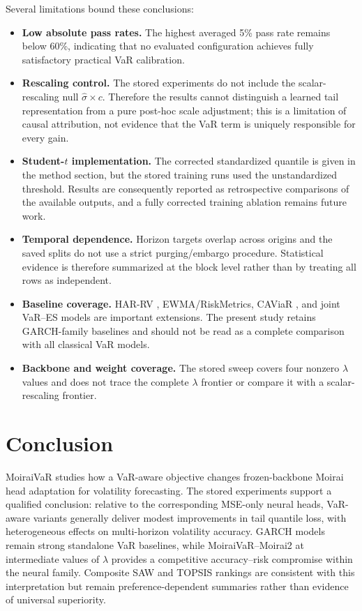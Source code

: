 \documentclass[runningheads]{llncs}
\begin{document}
Several limitations bound these conclusions:
\begin{itemize}
\item \textbf{Low absolute pass rates.} The highest averaged 5\% pass rate remains below 60\%, indicating that no evaluated configuration achieves fully satisfactory practical VaR calibration.
\item \textbf{Rescaling control.} The stored experiments do not include the scalar-rescaling null $\hat{\sigma}\times c$. Therefore the results cannot distinguish a learned tail representation from a pure post-hoc scale adjustment; this is a limitation of causal attribution, not evidence that the VaR term is uniquely responsible for every gain.
\item \textbf{Student-$t$ implementation.} The corrected standardized quantile is given in the method section, but the stored training runs used the unstandardized threshold. Results are consequently reported as retrospective comparisons of the available outputs, and a fully corrected training ablation remains future work.
\item \textbf{Temporal dependence.} Horizon targets overlap across origins and the saved splits do not use a strict purging/embargo procedure. Statistical evidence is therefore summarized at the block level rather than by treating all rows as independent.
\item \textbf{Baseline coverage.} HAR-RV \cite{ref18}, EWMA/RiskMetrics, CAViaR \cite{ref17}, and joint VaR--ES models \cite{ref24} are important extensions. The present study retains GARCH-family baselines and should not be read as a complete comparison with all classical VaR models.
\item \textbf{Backbone and weight coverage.} The stored sweep covers four nonzero $\lambda$ values and does not trace the complete $\lambda$ frontier or compare it with a scalar-rescaling frontier.
\end{itemize}

\section{Conclusion}
MoiraiVaR studies how a VaR-aware objective changes frozen-backbone Moirai head adaptation for volatility forecasting. The stored experiments support a qualified conclusion: relative to the corresponding MSE-only neural heads, VaR-aware variants generally deliver modest improvements in tail quantile loss, with heterogeneous effects on multi-horizon volatility accuracy. GARCH models remain strong standalone VaR baselines, while MoiraiVaR--Moirai2 at intermediate values of $\lambda$ provides a competitive accuracy--risk compromise within the neural family. Composite SAW and TOPSIS rankings are consistent with this interpretation but remain preference-dependent summaries rather than evidence of universal superiority.
\end{document}
